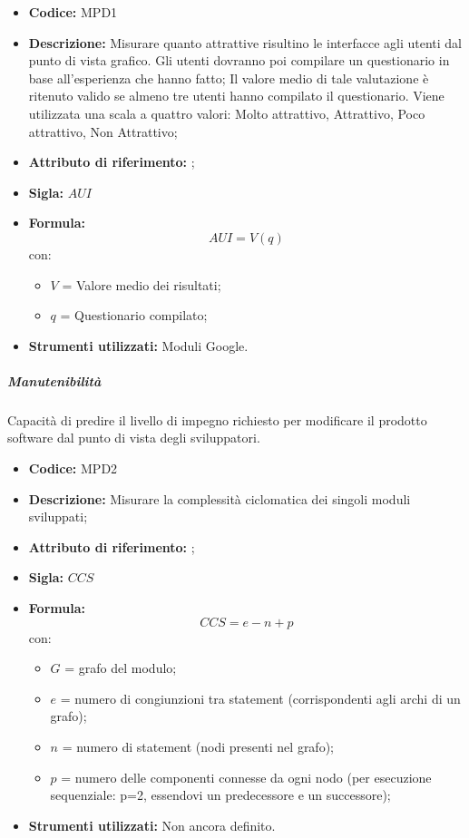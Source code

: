 \begin{itemize}
    \item \textbf{Codice:} MPD1
    \item \textbf{Descrizione:} Misurare quanto attrattive risultino le interfacce agli utenti dal punto di vista grafico.
    Gli utenti dovranno poi compilare un questionario in base all'esperienza che hanno fatto;
    Il valore medio di tale valutazione è ritenuto valido se almeno tre utenti hanno compilato il questionario. 
    Viene utilizzata una scala a quattro valori: Molto attrattivo, Attrattivo, Poco attrattivo, Non Attrattivo;
    \item \textbf{Attributo di riferimento:} ;
    \item \textbf{Sigla:} $AUI$
    \item \textbf{Formula:}$$AUI = V(q) $$
    con:
        \begin{itemize}
        \item $V$ = Valore medio dei risultati;
        \item $q$ = Questionario compilato;
        \end{itemize}
    \item \textbf{Strumenti utilizzati:} Moduli Google.
\end{itemize}

\subparagraph{Manutenibilità}
Capacità di predire il livello di impegno richiesto per modificare il prodotto software dal punto di vista degli sviluppatori.           
    \begin{itemize}
    \item \textbf{Codice:} MPD2
    \item \textbf{Descrizione:} Misurare la complessità ciclomatica dei singoli moduli sviluppati;
    \item \textbf{Attributo di riferimento:} ;
    \item \textbf{Sigla:} $CCS$
    \item \textbf{Formula:} $$CCS = e - n + p$$
    con:
    \begin{itemize}
        \item $G$ = grafo del modulo;
        \item $e$ = numero di congiunzioni tra statement (corrispondenti agli archi di un grafo);
        \item $n$ = numero di statement (nodi presenti nel grafo);
        \item $p$ = numero delle componenti connesse da ogni nodo (per esecuzione sequenziale: p=2, essendovi un predecessore e un successore);
    \end{itemize}
    \item \textbf{Strumenti utilizzati:} Non ancora definito.
\end{itemize}

